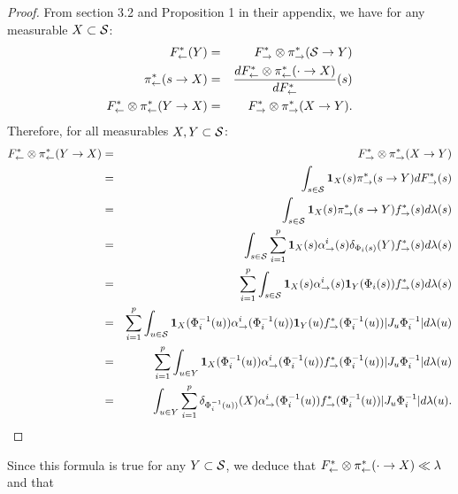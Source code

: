 \documentclass{article}
\theoremstyle{plain}
\theoremstyle{definition}
\theoremstyle{remark}
\theoremstyle{fact}
\begin{document}
\begin{proof}
    From \cite{brunswic2024theory} section 3.2 and Proposition 1 in their appendix, we have for any measurable $X\subset \mathcal S$:
    \begin{eqnarray}
        F^*_{\leftarrow}(Y) &=&  F^*_{\rightarrow} \otimes \pi_{\rightarrow}^* (\mathcal S \rightarrow Y) \\
        \pi_{\leftarrow}^*(s\rightarrow X) &=&  \frac{d F^*_{\leftarrow} \otimes \pi_{\leftarrow}^* ( \cdot \rightarrow X)}{dF^*_{\leftarrow}}(s)    \\
 F^*_{\leftarrow} \otimes \pi_{\leftarrow}^*(Y\rightarrow X) &=&  F^*_{\rightarrow} \otimes \pi_{\rightarrow}^*(X\rightarrow Y). 
\end{eqnarray}
Therefore, for all measurables $X,Y\subset \mathcal S$:
\begin{eqnarray}
F^*_{\leftarrow} \otimes \pi_{\leftarrow}^* (Y\rightarrow X) &=&  F^*_{\rightarrow} \otimes \pi_{\rightarrow}^* (X\rightarrow Y) \\ 
     &=& \int_{s\in \mathcal S} \mathbf{1}_{X}(s) \pi_{\rightarrow}^*(s\rightarrow Y) dF^*_{\rightarrow}(s) \\ 
    &=& \int_{s\in \mathcal S}\mathbf{1}_{X}(s)  \pi_{\rightarrow}^*(s\rightarrow Y) f^*_{\rightarrow}(s) d\lambda(s)\\ 
    &=& \int_{s\in \mathcal S} \sum_{i=1}^p \mathbf{1}_{X}(s) \alpha_{\rightarrow}^i(s) \delta_{\Phi_i(s)}(Y) f^*_{\rightarrow}(s) d\lambda(s)\\ 
    &=& \sum_{i=1}^p\int_{s\in \mathcal S} \mathbf{1}_{X}(s)  \alpha_{\rightarrow}^i(s) \mathbf{1}_{Y}(\Phi_i(s)) f^*_{\rightarrow}(s) d\lambda(s)\\ 
    &=& \sum_{i=1}^p\int_{u\in \mathcal S} \mathbf{1}_{X}(\Phi_i^{-1}(u)) \alpha_{\rightarrow}^i(\Phi_i^{-1}(u)) \mathbf{1}_{Y}(u) f^*_{\rightarrow}(\Phi_i^{-1}(u)) |J_{u} \Phi_i^{-1}| d\lambda(u)\\  
    &=& \sum_{i=1}^p\int_{u\in Y} \mathbf{1}_{X}(\Phi_i^{-1}(u))  \alpha_{\rightarrow}^i(\Phi_i^{-1}(u)) f^*_{\rightarrow}(\Phi_i^{-1}(u)) |J_{u} \Phi_i^{-1}| d\lambda(u)\\  
    &=&\int_{u\in Y} \sum_{i=1}^p  \delta_{\Phi_i^{-1}(u))}(X)  \alpha_{\rightarrow}^i(\Phi_i^{-1}(u)) f^*_{\rightarrow}(\Phi_i^{-1}(u)) |J_{u} \Phi_i^{-1}| d\lambda(u).  
\end{eqnarray}
\end{proof}
Since this formula is true for any $Y\subset \mathcal S$, we deduce that $F^*_{\leftarrow} \otimes \pi_{\leftarrow}^*(\cdot \rightarrow X)\ll \lambda$ and that 
\end{document}

